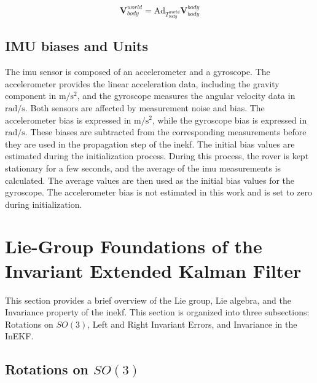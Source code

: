 \documentclass[report.tex]{subfiles}
\begin{document}
    \begin{equation}
        \boldsymbol{V}_{body}^{world} = \text{Ad}_{T_{body}^{world}} \boldsymbol{V}_{body}^{body}
    \label{eq:TwistTransformationEquation}
    \end{equation}

\subsection{IMU biases and Units}

The \gls{imu} sensor is composed of an accelerometer and a gyroscope. The accelerometer provides the linear acceleration data, including the gravity component in $\mathrm{m/s^2}$, and the gyroscope measures the angular velocity data in $\mathrm{rad/s}$. 
Both sensors are affected by measurement noise and bias. The accelerometer bias is expressed in $\mathrm{m/s^2}$, while the gyroscope bias is expressed in $\mathrm{rad/s}$. These biases are subtracted from the corresponding measurements before they are used in the propagation step of the \gls{inekf}. The initial bias values are estimated during the initialization process. During this process, the rover is kept stationary for a few seconds, and the average of the \gls{imu} measurements is calculated. The average values are then used as the initial bias values for the gyroscope. The accelerometer bias is not estimated in this work and is set to zero during initialization. 



\section{Lie-Group Foundations of the Invariant Extended Kalman Filter}
\label{sec:background_lie_groups_inekf}

This section provides a brief overview of the Lie group, Lie algebra, and the Invariance property of the \gls{inekf}. This section is organized into three subsections: Rotations on $SO(3)$, Left and Right Invariant Errors, and Invariance in the InEKF.

\subsection{Rotations on \texorpdfstring{$SO(3)$}{SO(3)}}
\label{subsec:background_so3}

\end{document}
